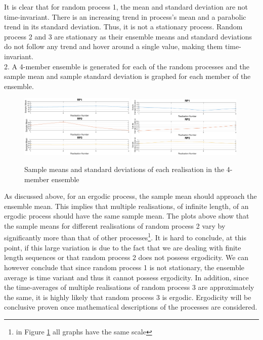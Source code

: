 \documentclass{article}
\begin{document}
It is clear that for random process 1, the mean and standard deviation are not time-invariant. There is an increasing trend in process's mean and a parabolic trend in its standard deviation. Thus, it is not a stationary process. Random process 2 and 3 are stationary as their ensemble means and standard deviations do not follow any trend and hover around a single value, making them time-invariant.\\

2. A 4-member ensemble is generated for each of the random processes and the sample mean and sample standard deviation is graphed for each member of the ensemble.

\begin{figure}[H]
\includegraphics[width=0.49\textwidth]{sample_mean_of_each_realisation}
\includegraphics[width=0.49\textwidth]{sample_standard_deviation_of_each_realisation}
\caption{Sample means and standard deviations of each realisation in the 4-member ensemble}
\label{fig:sample_mean_and_standard_deviation_of_each_realisation}
\end{figure}

As discussed above, for an ergodic process, the sample mean should approach the ensemble mean. This implies that multiple realisations, of infinite length, of an ergodic process should have the same sample mean. The plots above show that the sample means for different realisations of random process 2 vary by significantly more than that of other processes\footnote{in Figure \ref{fig:sample_mean_and_standard_deviation_of_each_realisation} all graphs have the same scale}. It is hard to conclude, at this point, if this large variation is due to the fact that we are dealing with finite length sequences or that random process 2 does not possess ergodicity. We can however conclude that since random process 1 is not stationary, the ensemble average is time variant and thus it cannot possess ergodicity. In addition, since the time-averages of multiple realisations of random process 3 are approximately the same, it is highly likely that random process 3 is ergodic. Ergodicity will be conclusive proven once mathematical descriptions of the processes are considered.\\
\end{document}
